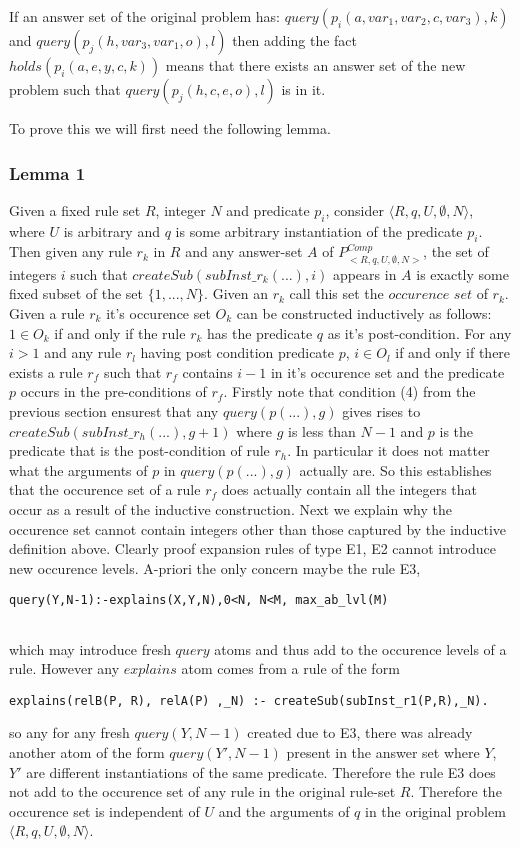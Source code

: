 If an answer set of the original problem has:
$query(p_{i}(a,var_{1},var_{2},c,var_{3}),k)$ and $query(p_{j}(h,var_{3},var_{1},o),l)$ then adding the fact $holds(p_{i}(a,e,y,c,k))$ means that there exists an answer set of the new problem such that $query(p_{j}(h,c,e,o),l)$ is in it. 

To prove this we will first need the following lemma.

\subsubsection{Lemma 1}
Given a fixed rule set $R$, integer $N$ and predicate $p_{i}$, consider $\langle R,q,U,\emptyset,N\rangle$, where $U$ is arbitrary and $q$ is some arbitrary instantiation of the predicate $p_{i}$. Then given any rule $r_{k}$ in $R$ and any answer-set $A$ of $P_{<R,q,U,\emptyset,N>}^{Comp}$, the set of integers $i$ such that $createSub(subInst\_r_{k}(...),i)$ appears in $A$ is exactly some fixed subset of the set $\{1,...,N\}$. Given an $r_{k}$ call this set the $\textit{occurence set}$ of $r_{k}$. Given a rule $r_{k}$ it's occurence set $O_{k}$ can be constructed inductively as follows:\\
$1 \in O_{k}$ if and only if the rule $r_{k}$ has the predicate $q$ as it's
post-condition. For any $i>1$ and any rule $r_{l}$ having post condition
predicate $p$, $i\in O_{l}$ if and only if there exists a rule $r_{f}$ such
that $r_{f}$ contains $i-1$ in it's occurence set and the predicate $p$ occurs
in the pre-conditions of $r_{f}$. Firstly note that condition (4) from the
previous section ensurest that any $query(p(...),g)$ gives rises to
$createSub(subInst\_r_{h}(...),g+1)$ where $g$ is less than $N-1$ and $p$ is
the predicate that is the post-condition of rule $r_{h}$. In particular it
does not matter what the arguments of $p$ in $query(p(...),g)$ actually
are. So this establishes that the occurence set of a rule $r_{f}$ does
actually contain all the integers that occur as a result of the inductive
construction. Next we explain why the occurence set cannot contain integers
other than those captured by the inductive definition above. Clearly proof
expansion rules of type E1, E2 cannot introduce new occurence levels. A-priori
the only concern maybe the rule E3,
\begin{verbatim}
query(Y,N-1):-explains(X,Y,N),0<N, N<M, max_ab_lvl(M)
    
\end{verbatim} 
which may introduce fresh $query$ atoms and thus add to the occurence levels of a rule. However any $explains$ atom comes from a rule of the form 
\begin{verbatim}
explains(relB(P, R), relA(P) ,_N) :- createSub(subInst_r1(P,R),_N).
\end{verbatim} 
so any for any fresh $query(Y,N-1)$ created due to E3, there was already another atom of the form $query(Y',N-1)$ present in the answer set where $Y$, $Y'$ are different instantiations of the same predicate. Therefore the rule E3 does not add to the occurence set of any rule in the original rule-set $R$. Therefore the occurence set is independent of $U$ and the arguments of $q$ in the original problem $\langle R,q,U,\emptyset,N\rangle$.

